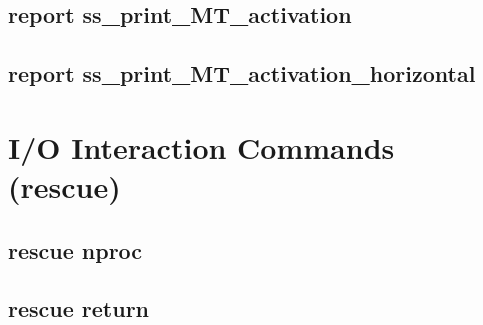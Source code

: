 \subsection{report ss\_print\_MT\_activation}

\subsection{report ss\_print\_MT\_activation\_horizontal}

\section{I/O Interaction Commands (rescue)}

\subsection{rescue nproc}

\subsection{rescue return}
